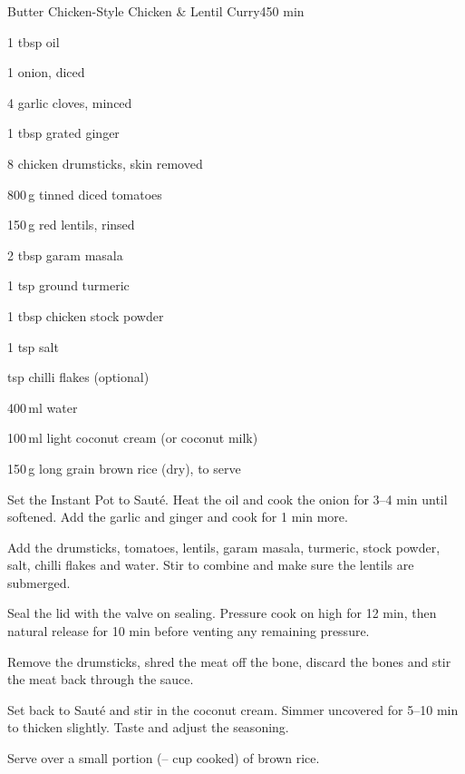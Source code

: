 \begin{recipebox}{Butter Chicken-Style Chicken \& Lentil Curry}{4}{50 min}

\begin{ingredients}
  \item 1 tbsp oil
  \item 1 onion, diced
  \item 4 garlic cloves, minced
  \item 1 tbsp grated ginger
  \item 8 chicken drumsticks, skin removed
  \item 800\,g tinned diced tomatoes
  \item 150\,g red lentils, rinsed
  \item 2 tbsp garam masala
  \item 1 tsp ground turmeric
  \item 1 tbsp chicken stock powder
  \item 1 tsp salt
  \item {} tsp chilli flakes (optional)
  \item 400\,ml water
  \item 100\,ml light coconut cream (or coconut milk)
  \item 150\,g long grain brown rice (dry), to serve
\end{ingredients}

\begin{method}
  \item Set the Instant Pot to Saut\'e. Heat the oil and cook the onion for 3--4 min until softened. Add the garlic and ginger and cook for 1 min more.
  \item Add the drumsticks, tomatoes, lentils, garam masala, turmeric, stock powder, salt, chilli flakes and water. Stir to combine and make sure the lentils are submerged.
  \item Seal the lid with the valve on sealing. Pressure cook on high for 12 min, then natural release for 10 min before venting any remaining pressure.
  \item Remove the drumsticks, shred the meat off the bone, discard the bones and stir the meat back through the sauce.
  \item Set back to Saut\'e and stir in the coconut cream. Simmer uncovered for 5--10 min to thicken slightly. Taste and adjust the seasoning.
  \item Serve over a small portion (-- cup cooked) of brown rice.
\end{method}


\end{recipebox}
